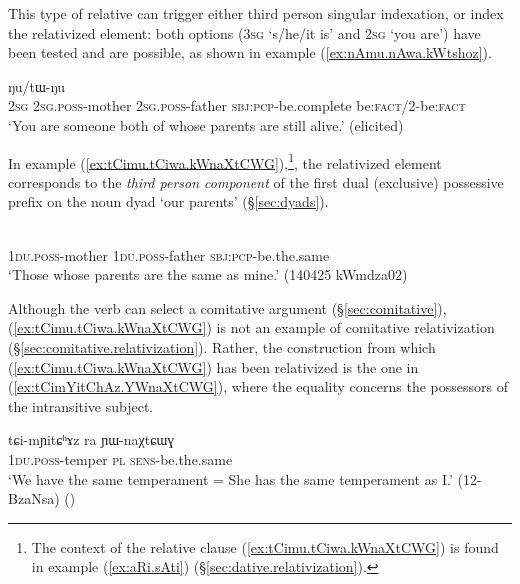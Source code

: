 This type of relative can trigger either third person singular indexation, or index the relativized element: both options (\textsc{3sg}  `s/he/it is' and \textsc{2sg}  `you are') have been tested and are possible, as shown in example (\ref{ex:nAmu.nAwa.kWtshoz}).

\begin{exe}
\ex \label{ex:nAmu.nAwa.kWtshoz}
 ŋu/tɯ-ŋu  \\  
\textsc{2sg} \textsc{2sg}.\textsc{poss}-mother  \textsc{2sg}.\textsc{poss}-father \textsc{sbj}:\textsc{pcp}-be.complete be:\textsc{fact}/2-be:\textsc{fact}  \\
\glt `You are someone both of whose parents are still alive.' (elicited)
\end{exe}

In example (\ref{ex:tCimu.tCiwa.kWnaXtCWG}),\footnote{The context of the relative clause (\ref{ex:tCimu.tCiwa.kWnaXtCWG}) is found in example (\ref{ex:aRi.sAti}) (§\ref{sec:dative.relativization}).}, the relativized element corresponds to the \textit{third person component} of the first dual (exclusive) possessive prefix  on the noun dyad  `our parents' (§\ref{sec:dyads}).
  

\begin{exe}
\ex \label{ex:tCimu.tCiwa.kWnaXtCWG}
 \\
\textsc{1du}.\textsc{poss}-mother  \textsc{1du}.\textsc{poss}-father \textsc{sbj}:\textsc{pcp}-be.the.same \\
\glt `Those whose parents are the same as mine.' (140425 kWmdza02)
\end{exe}

Although the verb  can select a comitative argument (§\ref{sec:comitative}), (\ref{ex:tCimu.tCiwa.kWnaXtCWG}) is not an example of comitative relativization (§\ref{sec:comitative.relativization}). Rather, the construction from which (\ref{ex:tCimu.tCiwa.kWnaXtCWG}) has been relativized is the one in (\ref{ex:tCimYitChAz.YWnaXtCWG}), where the equality concerns the possessors of the intransitive subject.

\begin{exe}
\ex \label{ex:tCimYitChAz.YWnaXtCWG}
\gll tɕi-mɲitɕʰɤz ra ɲɯ-naχtɕɯɣ \\
\textsc{1du}.\textsc{poss}-temper \textsc{pl} \textsc{sens}-be.the.same \\
\glt `We have the same temperament = She has the same temperament as I.' (12-BzaNsa)
()
\end{exe}

